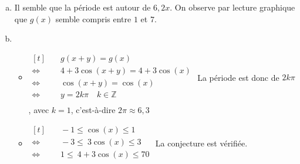 \documentclass[12pt, a4paper]{article}
\begin{document}
\begin{Exercise}[number={88}]
    \begin{enumerate}[a)]
        \item Il semble que la période est autour de $6{,}2x$. On observe par lecture graphique que $g(x)$ semble compris entre $1$ et $7$.
        \item   \begin{itemize}
                    \item   $\begin{aligned}[t]
                                &\quad g(x+y)=g(x) \\
                                \iff&\quad 4+3\cos(x+y)=4+3\cos(x) \\
                                \iff&\quad \cos(x+y)=\cos(x) \\
                                \iff&\quad y=2k\pi\quad k\in\mathbb{Z} \\
                            \end{aligned}$ \smallbreak
                            La période est donc de $2k\pi$, avec $k=1$, c'est-à-dire $2\pi\approx 6{,}3$ \medbreak
                    \item   $\begin{aligned}[t]
                                &\quad -1\leq\cos(x)\leq 1 \\
                                \iff&\quad -3\leq\ 3\cos(x)\leq 3 \\
                                \iff&\quad 1\leq\ 4+3\cos(x)\leq 70 \\
                            \end{aligned}$ \smallbreak
                            La conjecture est vérifiée. \medbreak
                \end{itemize}
    \end{enumerate}
\end{Exercise}
\end{document}
